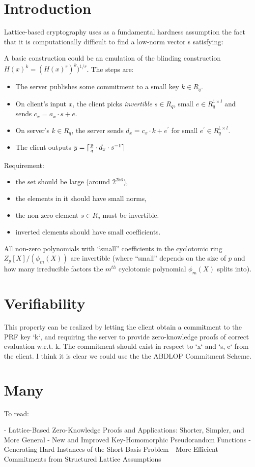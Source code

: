 \section{Introduction}%
\label{sec:introduction}

Lattice-based cryptography uses as a fundamental hardness assumption the fact that it is computationally difficult to find a low-norm vector s satisfying:

A basic construction could be an emulation of the blinding construction $H(x)^{k} = (H(x) ^{r})^{k}) ^ {1/r}$.
The steps are:

\begin{itemize}
  \item The server publishes some commitment to a small key $k \in R_q$.
  \item On client's input $x$, the client picks \emph{invertible} $s \in R_q$, small $e \in R^{1 \times l}_q$ and sends $c_x = a_x \cdot s + e$.
  \item On server's $k \in R_q$, the server sends $d_x = c_x \cdot k + e^{\prime}$ for small $e^{\prime} \in R^{1 \times l}_q$.
  \item The client outputs $y = \lceil {p \over q} \cdot d_x \cdot s^{-1} \rceil$
\end{itemize}

Requirement:

\begin{itemize}
  \item the set should be large (around $2^{256}$),
  \item the elements in it should have small norms,
  \item the non-zero element $s \in R_q$ must be invertible.
  \item inverted elements should have small coefficients.
\end{itemize}

All non-zero polynomials with ``small'' coefficients in the cyclotomic ring $Z_p[X]/(\phi_m(X))$ are invertible (where ``small'' depends on the size of $p$ and how many irreducible factors the $m^{th}$ cyclotomic polynomial $\phi_m(X)$ splits into).


\section{Verifiability}

This property can be realized by letting the client obtain a commitment to the PRF key `k`, and requiring the server to provide zero-knowledge proofs of correct evaluation w.r.t. k.
The commitment should exist in respect to `x` and `s, e` from the client.
I think it is clear we could use the the ABDLOP Commitment Scheme.

\section{Many}
To read:

- Lattice-Based Zero-Knowledge Proofs and Applications: Shorter, Simpler, and More General
- New and Improved Key-Homomorphic Pseudorandom Functions
- Generating Hard Instances of the Short Basis Problem
- More Efficient Commitments from Structured Lattice Assumptions


